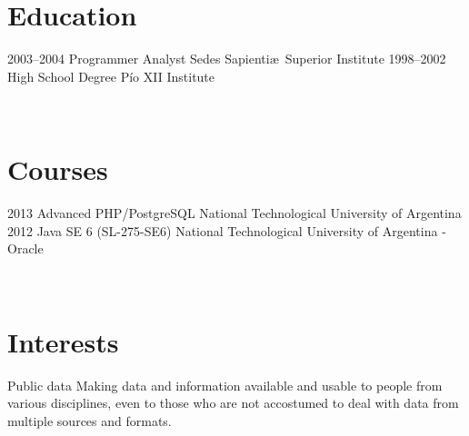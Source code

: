 \documentclass[]{cv-style}          %
\begin{document}
\section{Education}

\begin{entrylist}
\entry
{2003--2004}
{Programmer Analyst}
{Sedes Sapienti\ae\ Superior Institute}
{\vspace{-0.3cm}}
\entry
{1998--2002}
{High School Degree}
{Pío XII Institute}
{\vspace{-0.3cm}}

\end{entrylist}
\\

\section{Courses}

\begin{entrylist}
\entry
{2013}
{Advanced PHP/PostgreSQL}
{National Technological University of Argentina}
{\vspace{-0.3cm}}
\entry
{2012}
{Java SE 6 (SL-275-SE6)}
{National Technological University of Argentina - Oracle}
{\vspace{-0.3cm}}
\end{entrylist}
\\

\section{Interests}
\begin{entrylist}
\entry
{}
{Public data}
{}
{Making data and information available and usable to people from various disciplines, even to those who are not accostumed to deal with data from multiple sources and formats.}
{\vspace{-0.3cm}}
\end{entrylist}\
\\
\end{document}
